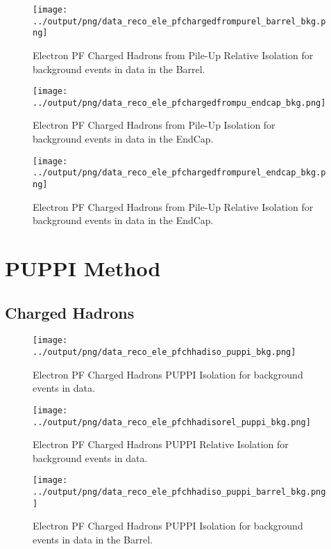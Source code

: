 \documentclass[11pt]{book}
\begin{document}
\begin{figure}[htb]
\centering
\texttt{[image: ../output/png/data\_reco\_ele\_pfchargedfrompurel\_barrel\_bkg.png]}
\caption{Electron PF Charged Hadrons from Pile-Up Relative Isolation for background events in data in the Barrel.}
\label{fig:data_ele_pfchargedfrompurel_barrel_bkg}
\end{figure}

\begin{figure}[htb]
\centering
\texttt{[image: ../output/png/data\_reco\_ele\_pfchargedfrompu\_endcap\_bkg.png]}
\caption{Electron PF Charged Hadrons from Pile-Up Isolation for background events in data in the EndCap.}
\label{fig:data_ele_pfchargedfrompu_endcap_bkg}
\end{figure}

\begin{figure}[htb]
\centering
\texttt{[image: ../output/png/data\_reco\_ele\_pfchargedfrompurel\_endcap\_bkg.png]}
\caption{Electron PF Charged Hadrons from Pile-Up Relative Isolation for background events in data in the EndCap.}
\label{fig:data_ele_pfchargedfrompurel_endcap_bkg}
\end{figure}
\clearpage

\section{PUPPI Method}
\subsection{Charged Hadrons}
\begin{figure}[htb]
\centering
\texttt{[image: ../output/png/data\_reco\_ele\_pfchhadiso\_puppi\_bkg.png]}
\caption{Electron PF Charged Hadrons PUPPI Isolation for background events in data.}
\label{fig:data_ele_pfchhadiso_puppi_bkg}
\end{figure}

\begin{figure}[htb]
\centering
\texttt{[image: ../output/png/data\_reco\_ele\_pfchhadisorel\_puppi\_bkg.png]}
\caption{Electron PF Charged Hadrons PUPPI Relative Isolation for background events in data.}
\label{fig:data_ele_pfchhadisorel_puppi_bkg}
\end{figure}

\begin{figure}[htb]
\centering
\texttt{[image: ../output/png/data\_reco\_ele\_pfchhadiso\_puppi\_barrel\_bkg.png]}
\caption{Electron PF Charged Hadrons PUPPI Isolation for background events in data in the Barrel.}
\label{fig:data_ele_pfchhadiso_puppi_barrel_bkg}
\end{figure}
\end{document}

